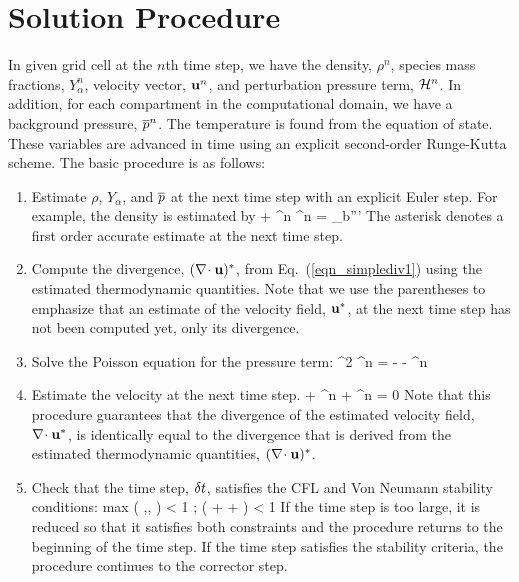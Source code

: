 \section{Solution Procedure}

In given grid cell at the $n$th time step, we have the density, $\rho^n$, species mass fractions, $Y_\alpha^n$, velocity
vector, ${\bf u}^n$, and perturbation pressure term, ${\cal H}^n$.
In addition, for each compartment in the computational domain, we have a background pressure, $\overline{p}^n$. The temperature is
found from the equation of state. These variables are advanced in time using an explicit second-order Runge-Kutta scheme.
The basic procedure is as follows:

\begin{enumerate}
\item Estimate $\rho$, $Y_\alpha$, and $\overline{p}$ at the next time step with an explicit Euler step. For
example, the density is estimated by
\be {} + \nabla\!\cdot \rho^n \bu^n = \dm_b''' \ee
The asterisk denotes a first order accurate estimate at the next time step.

\item Compute the divergence, $(\nabla\!\cdot {\bf u})^*$, from Eq.~(\ref{eqn_simplediv1}) using the estimated thermodynamic quantities.
Note that we use the parentheses to emphasize that an estimate of the
velocity field, ${\bf u}^*$, at the next time step has not been computed yet, only its divergence.

\item Solve the Poisson equation for the pressure term:
\be \nabla^2 \cH^n = -  - \nabla\!\cdot \bF^n  \ee

\item Estimate the velocity at the next time step.
\be
{} +  \bF^n + ^n = 0
\ee
Note that this procedure guarantees that the divergence of the estimated velocity field, $\nabla\!\cdot {\bf u}^*$, is identically
equal to the divergence that
is derived from the estimated thermodynamic quantities, $(\nabla\!\cdot {\bf u})^*$.

\item Check that the time step, $\delta t$, satisfies the CFL and Von Neumann stability conditions:
\be \dt \; \hbox{max} \left( ,, \right) < 1 \quad ;  \; \dt \; \nu \; \left( +  +  \right) < 1 \ee
If the time step is too large, it is reduced so that it satisfies
both constraints and the procedure returns to the beginning of the time step.
If the time step satisfies the stability criteria, the procedure continues to the corrector step.
\end{enumerate}

